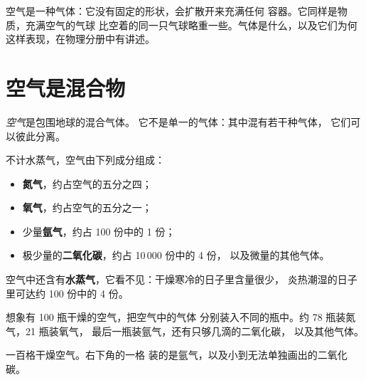 \begin{remark}[空气是一种气体]\label{rem:g4:air-a-mixture-of-gases:gas}
空气是一种气体：它没有固定的形状，会扩散开来充满任何
容器。它同样是物质，充满空气的气球
比空着的同一只气球略重一些。气体是什么，以及它们为何
这样表现，在物理分册中有讲述。
\end{remark}

\section{空气是混合物}

\begin{definition}[空气]\label{def:g4:air-a-mixture-of-gases:air}
\emph{空气}是包围地球的混合气体。
它不是单一的气体：其中混有若干种气体，
它们可以彼此分离。
\end{definition}

\begin{proposition}[空气的组成]\label{prop:g4:air-a-mixture-of-gases:composition}
不计水蒸气，空气由下列成分组成：
\begin{itemize}
  \item \textbf{氮气}，约占空气的五分之四；
  \item \textbf{氧气}，约占空气的五分之一；
  \item 少量\textbf{氩气}，约占 100 份中的 1 份；
  \item 极少量的\textbf{二氧化碳}，约占 10\,000 份中的 4 份，
        以及微量的其他气体。
\end{itemize}
空气中还含有\textbf{水蒸气}，它看不见：干燥寒冷的日子里含量很少，
炎热潮湿的日子里可达约 100 份中的 4 份。
\end{proposition}

\begin{example}[一百瓶空气]\label{ex:g4:air-a-mixture-of-gases:hundred}
想象有 100 瓶干燥的空气，把空气中的气体
分别装入不同的瓶中。约 78 瓶装氮气，21 瓶装氧气，
最后一瓶装氩气，还有只够几滴的二氧化碳，
以及其他气体。
\end{example}

\begin{omfigure}

{\small 一百格干燥空气。右下角的一格
装的是氩气，以及小到无法单独画出的二氧化碳。}
\end{omfigure}

